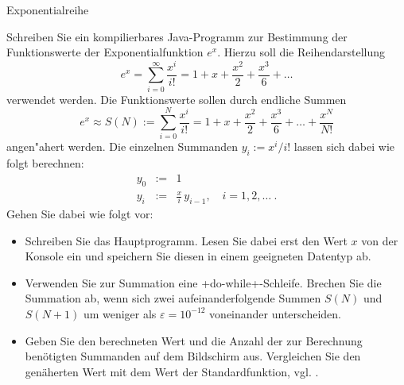 \begin{exercise}{Exponentialreihe}

\begin{body}
Schreiben Sie ein kompilierbares Java-Programm zur Bestimmung der Funktionswerte der Exponentialfunktion $e^x$.
Hierzu soll die Reihendarstellung
\[
  e^x = \sum_{i=0}^{\infty} \frac{x^i}{i!}=
  1+x+\frac{x^2}{2}+\frac{x^3}{6}+\ldots
\]
verwendet werden.
Die Funktionswerte sollen durch endliche Summen
\[
  e^x \approx S(N):=\sum_{i=0}^{N} \frac{x^i}{i!}=
  1+x+\frac{x^2}{2}+\frac{x^3}{6}+\ldots+\frac{x^N}{N!}
\]
angen"ahert werden.
Die einzelnen Summanden $y_i := x^i/i! $ lassen sich dabei wie folgt berechnen:
\begin{eqnarray*}
  y_0 & := & 1 \\
  y_i & := & \frac{x}{i}\,y_{i-1}, \quad i = 1,2,\ldots \ .
\end{eqnarray*}
Gehen Sie dabei wie folgt vor:
\begin{itemize}
  \item Schreiben Sie das Hauptprogramm.
        Lesen Sie dabei erst den Wert $x$ von der Konsole ein und speichern Sie diesen in einem geeigneten Datentyp ab.
  \item Verwenden Sie zur Summation eine \code+do-while+-Schleife.
        Brechen Sie die Summation ab, wenn sich zwei aufeinanderfolgende Summen $S(N)$ und $S(N+1)$ um weniger als $\varepsilon=10^{-12}$ voneinander unterscheiden.
  \item Geben Sie den berechneten Wert und die Anzahl der zur Berechnung ben\"otigten Summanden auf dem Bildschirm aus.
        Vergleichen Sie den gen\"aherten Wert mit dem Wert der Standardfunktion, vgl. .
\end{itemize}

\end{body}

\begin{solution}
  \newpage
\end{solution}

\end{exercise}
